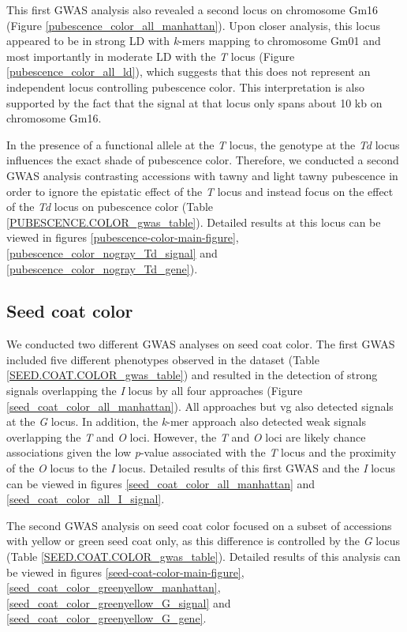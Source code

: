 \documentclass[12pt]{article}
\begin{document}
This first GWAS analysis also revealed a second locus on chromosome Gm16
(Figure \ref{pubescence_color_all_manhattan}). Upon closer analysis, this locus
appeared to be in strong LD with \emph{k}-mers mapping to chromosome Gm01 and
most importantly in moderate LD with the \emph{T} locus (Figure
\ref{pubescence_color_all_ld}), which suggests that this does not represent an
independent locus controlling pubescence color. This interpretation is also
supported by the fact that the signal at that locus only spans about 10 kb on
chromosome Gm16.

In the presence of a functional allele at the \emph{T} locus, the genotype at
the \emph{Td} locus influences the exact shade of pubescence color.  Therefore,
we conducted a second GWAS analysis contrasting accessions with tawny and light
tawny pubescence in order to ignore the epistatic effect of the \emph{T} locus
and instead focus on the effect of the \emph{Td} locus on pubescence color
(Table \ref{PUBESCENCE.COLOR_gwas_table}). Detailed results at this locus
can be viewed in figures \ref{pubescence-color-main-figure}, \ref{pubescence_color_nogray_Td_signal} and
\ref{pubescence_color_nogray_Td_gene}). 

\subsection{Seed coat color}
\label{sv-gwas-seed-coat-color}

We conducted two different GWAS analyses on seed coat color. The first GWAS
included five different phenotypes observed in the dataset (Table
\ref{SEED.COAT.COLOR_gwas_table}) and resulted in the detection of strong
signals overlapping the \emph{I} locus by all four approaches (Figure
\ref{seed_coat_color_all_manhattan}). All approaches but vg also detected
signals at the \emph{G} locus. In addition, the \emph{k}-mer approach also
detected weak signals overlapping the \emph{T} and \emph{O} loci. However, the
\emph{T} and \emph{O} loci are likely chance associations given the low \textit{p}-value
associated with the \emph{T} locus and the proximity of the \emph{O} locus to
the \emph{I} locus. Detailed results of this first GWAS and the \textit{I}
locus can be viewed in figures \ref{seed_coat_color_all_manhattan} and
\ref{seed_coat_color_all_I_signal}.

The second GWAS analysis on seed coat color focused on a subset of accessions
with yellow or green seed coat only, as this difference is controlled by the
\emph{G} locus (Table \ref{SEED.COAT.COLOR_gwas_table}). Detailed results of
this analysis can be viewed in figures \ref{seed-coat-color-main-figure},
\ref{seed_coat_color_greenyellow_manhattan},
\ref{seed_coat_color_greenyellow_G_signal} and
\ref{seed_coat_color_greenyellow_G_gene}.
\end{document}
